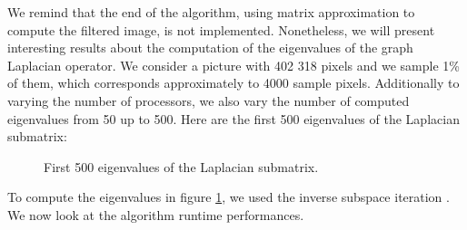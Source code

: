 We remind that the end of the algorithm, using matrix approximation to compute the filtered image, is not implemented.
Nonetheless, we will present interesting results about the computation of the eigenvalues of the graph Laplacian operator.
We consider a picture with 402 318 pixels and we sample 1\% of them, which corresponds approximately to 4000 sample pixels.
Additionally to varying the number of processors, we also vary the number of computed eigenvalues from 50 up to 500.
Here are the first 500 eigenvalues of the Laplacian submatrix:

\begin{figure}[H]
  \centering
  
  \caption{First 500 eigenvalues of the Laplacian submatrix.}
  \label{fig:500_eigenvalues}
\end{figure}

To compute the eigenvalues in figure \ref{fig:500_eigenvalues}, we used the inverse subspace iteration \cite{el_khoury_acceleration_2014}.
We now look at the algorithm runtime performances.
